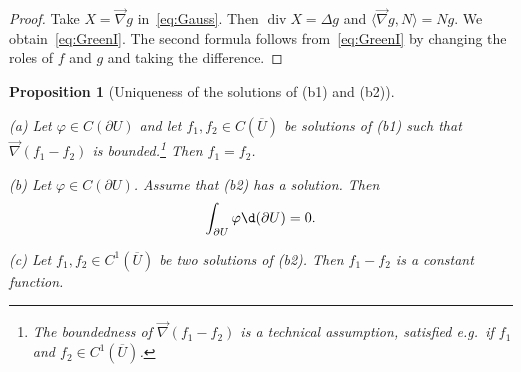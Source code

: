 \documentclass[12pt, oneside, a4paper]{article}
\newtheorem{prop}[thm]{Proposition}
\def\grad{\operatorname{grad}}
\def\divergence{\operatorname{div}}
\theoremstyle{dfn}
\def \grad {\overrightarrow{\nabla}}
\newcommand{\scalprod}[2]{\langle #1,#2 \rangle}
\begin{document}
\begin{proof}
Take $X = \grad g$ in~\eqref{eq:Gauss}. Then $\divergence X = \Delta g$ and $\scalprod{\grad g}{N} = Ng$. We obtain~\eqref{eq:GreenI}.
The second formula follows from~\eqref{eq:GreenI} by changing the roles of $f$ and $g$ and taking the difference.
\end{proof}

\begin{prop}[Uniqueness of the solutions of (b1) and (b2)]\label{Prop:UniquenessB1B2}~

(a) Let $\varphi \in C(\partial U)$ and let $f_1, f_2 \in C(\overline{U})$ be solutions of \emph{(b1)} such that $\grad (f_1 - f_2)$ is bounded.\footnote{The boundedness of $\grad (f_1 - f_2)$ is a technical assumption, satisfied e.g.\ if $f_1$ and $f_2 \in C^1(\overline{U})$.} Then $f_1 = f_2$.

(b) Let $\varphi \in C(\partial U)$. Assume that (b2) has a solution. Then
\[
\int _{\partial U} \varphi \d(\partial U) = 0.
\]

(c) Let $f_1, f_2 \in C^1(\overline{U})$ be two solutions of (b2). Then $f_1 - f_2$ is a constant function.
\end{prop}
\end{document}
